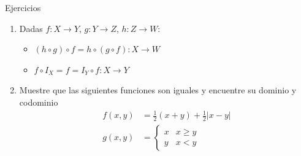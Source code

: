 \documentclass[14pt,aspectratio=169,xcolor=dvipsnames]{beamer}
\begin{document}
\begin{frame}{Ejercicios}
    \begin{enumerate}
        \item Dadas $f:X\to Y$, $g:Y\to Z$, $h:Z\to W$:
            \begin{itemize}
                \item $(h\circ g)\circ f = h\circ (g\circ f):X \to W$
                \item $f\circ I_X = f = I_Y\circ f: X\to Y$
            \end{itemize}
        \item Muestre que las siguientes funciones son iguales y encuentre su dominio y codominio
                $$\begin{aligned}
                    f(x,y) &= \frac 1 2 (x+y) + \frac 1 2 |x - y| \\
                    g(x,y) &= \begin{cases}x & x\geq y \\ y & x < y \end{cases}
                \end{aligned}$$
    \end{enumerate}
\end{frame}
\begin{frame}
    \maketitle
\end{frame}
\end{document}
